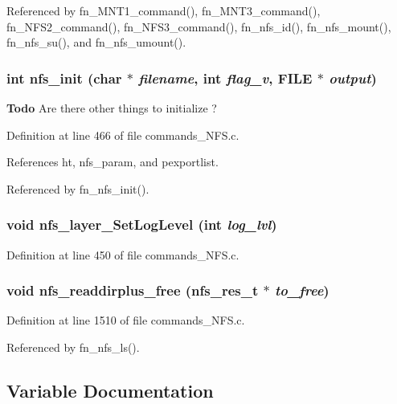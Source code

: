 Referenced by fn\_\-MNT1\_\-command(), fn\_\-MNT3\_\-command(), fn\_\-NFS2\_\-command(), fn\_\-NFS3\_\-command(), fn\_\-nfs\_\-id(), fn\_\-nfs\_\-mount(), fn\_\-nfs\_\-su(), and fn\_\-nfs\_\-umount().
\subsubsection{\setlength{\rightskip}{0pt plus 5cm}int nfs\_\-init (char $\ast$ {\em filename}, int {\em flag\_\-v}, FILE $\ast$ {\em output})}\label{commands__NFS_8c_a21}


\begin{Desc}
\item[{\bf Todo}]Are there other things to initialize ?\end{Desc}


Definition at line 466 of file commands\_\-NFS.c.

References ht, nfs\_\-param, and pexportlist.

Referenced by fn\_\-nfs\_\-init().
\subsubsection{\setlength{\rightskip}{0pt plus 5cm}void nfs\_\-layer\_\-Set\-Log\-Level (int {\em log\_\-lvl})}\label{commands__NFS_8c_a19}




Definition at line 450 of file commands\_\-NFS.c.
\subsubsection{\setlength{\rightskip}{0pt plus 5cm}void nfs\_\-readdirplus\_\-free (nfs\_\-res\_\-t $\ast$ {\em to\_\-free})}\label{commands__NFS_8c_a32}




Definition at line 1510 of file commands\_\-NFS.c.

Referenced by fn\_\-nfs\_\-ls().

\subsection{Variable Documentation}
